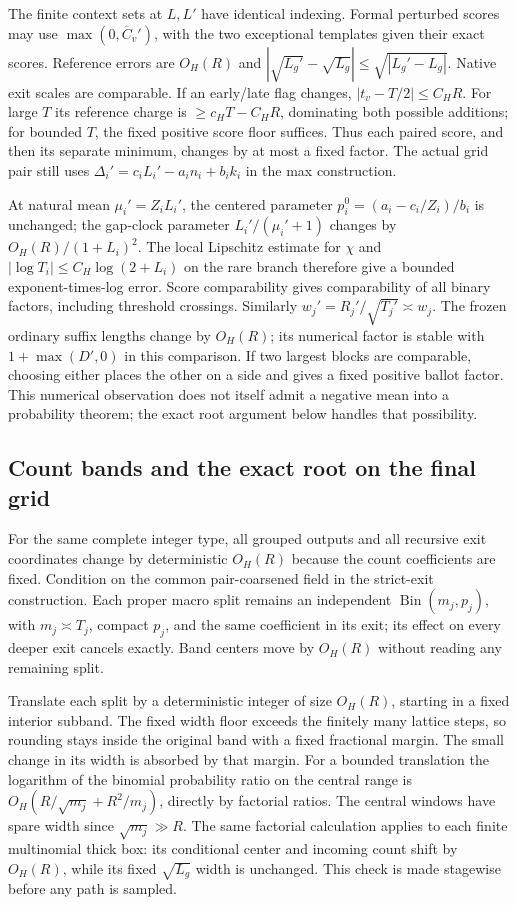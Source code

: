 The finite context sets at $L,L'$ have identical indexing. Formal
perturbed scores may use $\max(0,\overline C_v')$, with the two
exceptional templates given their exact scores. Reference errors
are $O_H(R)$ and
$|\sqrt{L_g'}-\sqrt{L_g}|\leq\sqrt{|L_g'-L_g|}$.
Native exit scales are comparable. If an early/late flag changes,
$|t_v-T/2|\leq C_HR$. For large $T$ its reference charge is
$\geq c_HT-C_HR$, dominating both possible additions; for bounded
$T$, the fixed positive score floor suffices. Thus each paired score,
and then its separate minimum, changes by at most a fixed factor.
The actual grid pair still uses
$\Delta_i'=c_iL_i'-a_in_i+b_ik_i$ in the max construction.

At natural mean $\mu_i'=Z_iL_i'$, the centered parameter
$p_i^0=(a_i-c_i/Z_i)/b_i$ is unchanged; the gap-clock parameter
$L_i'/(\mu_i'+1)$ changes by $O_H(R)/(1+L_i)^2$.
The local Lipschitz estimate for $\chi$ and
$|\log T_i|\leq C_H\log(2+L_i)$ on the rare branch therefore
give a bounded exponent-times-log error. Score comparability gives
comparability of all binary factors, including threshold crossings.
Similarly $w_j'=R_j'/\sqrt{T_j'}\asymp w_j$.
The frozen ordinary suffix lengths change by $O_H(R)$; its numerical
factor is stable with $1+\max(D',0)$ in this comparison. If two
largest blocks are comparable, choosing either places the other on
a side and gives a fixed positive ballot factor. This numerical
observation does not itself admit a negative mean into a probability
theorem; the exact root argument below handles that possibility.

\subsection{Count bands and the exact root on the final grid}
\label{arithdetail:grid-counts}
For the same complete integer type, all grouped outputs and all
recursive exit coordinates change by deterministic $O_H(R)$ because
the count coefficients are fixed. Condition on the common pair-coarsened
field in the strict-exit construction. Each proper macro split remains
an independent $\operatorname{Bin}(m_j,p_j)$, with $m_j\asymp T_j$,
compact $p_j$, and the same coefficient in its exit; its effect on every
deeper exit cancels exactly. Band centers move by $O_H(R)$ without
reading any remaining split.

Translate each split by a deterministic integer of size $O_H(R)$,
starting in a fixed interior subband. The fixed width floor exceeds
the finitely many lattice steps, so rounding stays inside the original
band with a fixed fractional margin. The small change in its width
is absorbed by that margin. For a bounded translation the logarithm
of the binomial probability ratio on the central range is
$O_H(R/\sqrt{m_j}+R^2/m_j)$, directly by factorial ratios.
The central windows have spare width since $\sqrt{m_j}\gg R$.
The same factorial calculation applies to each finite multinomial
thick box: its conditional center and incoming count shift by
$O_H(R)$, while its fixed $\sqrt{L_g}$ width is unchanged.
This check is made stagewise before any path is sampled.

